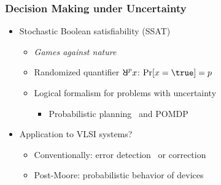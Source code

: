 \begin{frame}
      \frametitle{Decision Making under Uncertainty}
      \begin{itemize}
            \item Stochastic Boolean satisfiability (SSAT)
                  \begin{itemize}
                        \item \emph{Games against nature}~\cite{Papadimitriou1985}
                        \item Randomized quantifier $\random{p}x$: $\spb{x=\true}=p$
                        \item Logical formalism for problems with uncertainty
                              \begin{itemize}
                                    \item Probabilistic planning~\cite{Majercik1998,Majercik2003,Majercik2005} and POMDP~\cite{Salmon2020}
                              \end{itemize}
                  \end{itemize}
                  \pause
            \item Application to VLSI systems?
                  \begin{itemize}
                        \item Conventionally: error detection~\cite{Constantinescu2003} or correction~\cite{Mitra2006}
                        \item Post-Moore: probabilistic behavior of devices~\cite{Chakrapani2006ProbDesign}
                  \end{itemize}
      \end{itemize}
\end{frame}

